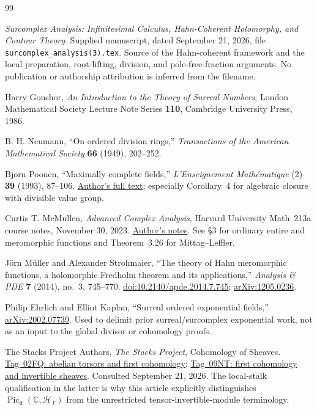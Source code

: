 \documentclass[11pt,letterpaper]{article}
\theoremstyle{definition}
\theoremstyle{remark}
\newcommand{\C}{\mathbb C}
\newcommand{\HH}{\mathscr H_\Gamma}
\newcommand{\Piclf}{\operatorname{Pic}_{\mathrm{lf}}}
\numberwithin{equation}{section}
\begin{document}
\begin{thebibliography}{99}

\emph{Surcomplex Analysis: Infinitesimal Calculus, Hahn-Coherent Holomorphy, and Contour Theory}.
Supplied manuscript, dated September 21, 2026, file
\texttt{surcomplex\_analysis(3).tex}.
Source of the Hahn-coherent framework and the local preparation, root-lifting, division, and pole-free-fraction arguments. No publication or authorship attribution is inferred from the filename.

Harry Gonshor,
\emph{An Introduction to the Theory of Surreal Numbers},
London Mathematical Society Lecture Note Series \textbf{110},
Cambridge University Press, 1986.

B. H. Neumann,
``On ordered division rings,''
\emph{Transactions of the American Mathematical Society}
\textbf{66} (1949), 202--252.

Bjorn Poonen,
``Maximally complete fields,''
\emph{L'Enseignement Math\'ematique} (2) \textbf{39} (1993), 87--106.
\href{https://math.mit.edu/~poonen/papers/amsval.pdf}{Author's full text};
especially Corollary~4 for algebraic closure with divisible value group.

Curtis T. McMullen,
\emph{Advanced Complex Analysis}, Harvard University Math~213a course notes,
November 30, 2023.
\href{https://people.math.harvard.edu/~ctm/home/text/class/harvard/213a/23/html/home/course/course.pdf}{Author's notes}.
See \S3 for ordinary entire and meromorphic functions and Theorem~3.26 for Mittag--Leffler.

J\"orn M\"uller and Alexander Strohmaier,
``The theory of Hahn meromorphic functions, a holomorphic Fredholm theorem and its applications,''
\emph{Analysis \& PDE} \textbf{7} (2014), no.~3, 745--770.
\href{https://doi.org/10.2140/apde.2014.7.745}{doi:10.2140/apde.2014.7.745};
\href{https://arxiv.org/abs/1205.0236}{arXiv:1205.0236}.

Philip Ehrlich and Elliot Kaplan,
``Surreal ordered exponential fields,''
\href{https://arxiv.org/abs/2002.07739}{arXiv:2002.07739}.
Used to delimit prior surreal/surcomplex exponential work, not as an input to the global divisor or cohomology proofs.

The Stacks Project Authors,
\emph{The Stacks Project}, Cohomology of Sheaves.
\href{https://stacks.math.columbia.edu/tag/02FQ}{Tag~02FQ: abelian torsors and first cohomology};
\href{https://stacks.math.columbia.edu/tag/09NT}{Tag~09NT: first cohomology and invertible sheaves}.
Consulted September 21, 2026. The local-stalk qualification in the latter is why this article explicitly distinguishes $\Piclf(\C,\HH)$ from the unrestricted tensor-invertible-module terminology.

\end{thebibliography}
\end{document}
